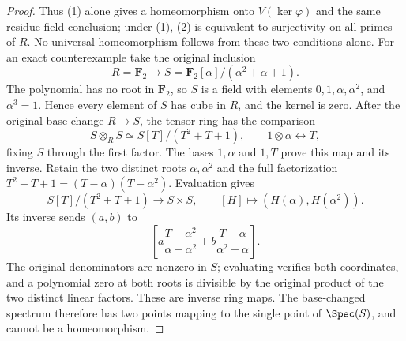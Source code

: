 \begin{proof}
Thus (1) alone gives a homeomorphism
onto $V(\ker\varphi)$ and the same
residue-field conclusion; under (1),
(2) is equivalent to surjectivity
on all primes of $R$. No universal
homeomorphism follows from these two
conditions alone. For an exact
counterexample take the original
inclusion
$$
R=\mathbf F_2\longrightarrow
S=\mathbf F_2[\alpha]/(\alpha^2+\alpha+1).
$$
The polynomial has no root in
$\mathbf F_2$, so $S$ is a field
with elements $0,1,\alpha,\alpha^2$,
and $\alpha^3=1$. Hence every
element of $S$ has cube in $R$,
and the kernel is zero. After the
original base change $R\to S$,
the tensor ring has the comparison
$$
S\otimes_R S\simeq S[T]/(T^2+T+1),
\qquad1\otimes\alpha\longleftrightarrow T,
$$
fixing $S$ through the first factor.
The bases $1,\alpha$ and $1,T$
prove this map and its inverse.
Retain the two distinct roots
$\alpha,\alpha^2$ and the full
factorization
$T^2+T+1=(T-\alpha)(T-\alpha^2)$.
Evaluation gives
$$
S[T]/(T^2+T+1)\longrightarrow S\times S,
\qquad[H]\longmapsto(H(\alpha),H(\alpha^2)).
$$
Its inverse sends $(a,b)$ to
$$
\left[
a\frac{T-\alpha^2}{\alpha-\alpha^2}
+b\frac{T-\alpha}{\alpha^2-\alpha}
\right].
$$
The original denominators are nonzero
in $S$; evaluating verifies both
coordinates, and a polynomial zero
at both roots is divisible by the
original product of the two distinct
linear factors. These are inverse
ring maps. The base-changed spectrum
therefore has two points mapping
to the single point of $\Spec(S)$,
and cannot be a homeomorphism.
\end{proof}